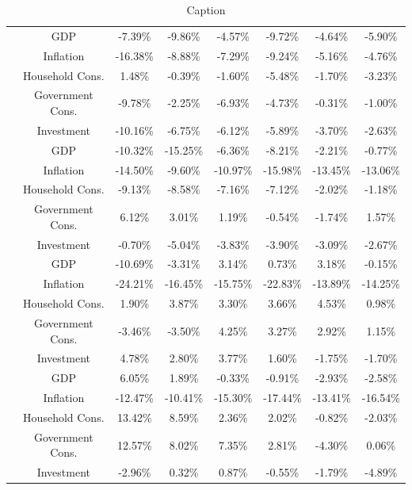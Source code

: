 \documentclass[12pt]{article}
\begin{document}
\begin{table}[ht]
\begin{tabular}{ c|c| c c c c c c|}
        \parbox[t]{5mm}{} 
& GDP  & -7.39\%  & -9.86\%  & -4.57\%  & -9.72\%  & -4.64\%  & -5.90\% \\
& Inflation  & -16.38\%  & -8.88\%  & -7.29\%  & -9.24\%  & -5.16\%  & -4.76\% \\
& Household Cons.  & 1.48\%  & -0.39\%  & -1.60\%  & -5.48\%  & -1.70\%  & -3.23\% \\
& Government Cons.  & -9.78\%  & -2.25\%  & -6.93\%  & -4.73\%  & -0.31\%  & -1.00\% \\
& Investment  & -10.16\%  & -6.75\%  & -6.12\%  & -5.89\%  & -3.70\%  & -2.63\% \\
        \hline
        \parbox[t]{5mm}{}
& GDP  & -10.32\%  & -15.25\%  & -6.36\%  & -8.21\%  & -2.21\%  & -0.77\% \\
& Inflation  & -14.50\%  & -9.60\%  & -10.97\%  & -15.98\%  & -13.45\%  & -13.06\% \\
& Household Cons.  & -9.13\%  & -8.58\%  & -7.16\%  & -7.12\%  & -2.02\%  & -1.18\% \\
& Government Cons.  & 6.12\%  & 3.01\%  & 1.19\%  & -0.54\%  & -1.74\%  & 1.57\% \\
& Investment  & -0.70\%  & -5.04\%  & -3.83\%  & -3.90\%  & -3.09\%  & -2.67\% \\
        \hline
        \parbox[t]{5mm}{} 
& GDP  & -10.69\%  & -3.31\%  & 3.14\%  & 0.73\%  & 3.18\%  & -0.15\% \\
& Inflation  & -24.21\%  & -16.45\%  & -15.75\%  & -22.83\%  & -13.89\%  & -14.25\% \\
& Household Cons.  & 1.90\%  & 3.87\%  & 3.30\%  & 3.66\%  & 4.53\%  & 0.98\% \\
& Government Cons.  & -3.46\%  & -3.50\%  & 4.25\%  & 3.27\%  & 2.92\%  & 1.15\% \\
& Investment  & 4.78\%  & 2.80\%  & 3.77\%  & 1.60\%  & -1.75\%  & -1.70\% \\
        \hline
        \parbox[t]{5mm}{}
& GDP  & 6.05\%  & 1.89\%  & -0.33\%  & -0.91\%  & -2.93\%  & -2.58\% \\
& Inflation  & -12.47\%  & -10.41\%  & -15.30\%  & -17.44\%  & -13.41\%  & -16.54\% \\
& Household Cons.  & 13.42\%  & 8.59\%  & 2.36\%  & 2.02\%  & -0.82\%  & -2.03\% \\
& Government Cons.  & 12.57\%  & 8.02\%  & 7.35\%  & 2.81\%  & -4.30\%  & 0.06\% \\
& Investment  & -2.96\%  & 0.32\%  & 0.87\%  & -0.55\%  & -1.79\%  & -4.89\% \\
    \hline
    \end{tabular}
    \caption{Caption}
    \label{tab:placeholder}
\end{table}
\end{document}
